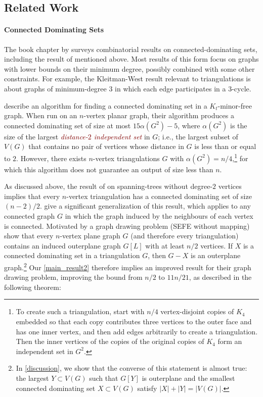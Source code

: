 \documentclass{article}
\newcommand{\defin}[1]{\emph{\textcolor{Maroon}{#1}}}
\theoremstyle{definition}
\begin{document}
\subsection{Related Work}
\label{related_work}

\paragraph{Connected Dominating Sets}

The book chapter by \citet{chellali.favaron:connected} surveys combinatorial results on connected-dominating sets, including the result of \citet{kleitman.west:spanning} mentioned above.  Most results of this form focus on graphs with lower bounds on their minimum degree, possibly combined with some other constraints.  For example, the Kleitman-West result relevant to triangulations is about graphs of minimum-degree $3$ in which each edge participates in a $3$-cycle.

\citet{wan.alzoubi.ea:simple} describe an algorithm for finding a connected dominating set in a $K_t$-minor-free graph. When run on an $n$-vertex planar graph, their algorithm produces a connected dominating set of size at most $15\alpha(G^2)-5$, where $\alpha(G^2)$ is the size of the largest \defin{distance-$2$ independent set} in $G$; i.e., the largest subset of $V(G)$ that contains no pair of vertices whose distance in $G$ is less than or equal to $2$.  However, there exists $n$-vertex triangulations $G$ with $\alpha(G^2)=n/4$,\footnote{To create such a triangulation, start with $n/4$ vertex-disjoint copies of $K_4$ embedded so that each copy contributes three vertices to the outer face and has one inner vertex, and then add edges arbitrarily to create a triangulation.  Then the inner vertices of the copies of the original copies of $K_4$ form an independent set in $G^2$.} for which this algorithm does not guarantee an output of size less than $n$.

As discussed above, the result of \citet{albertson.berman.ea:graphs} on spanning-trees without degree-$2$ vertices implies that every $n$-vertex triangulation has a connected dominating set of size $(n-2)/2$.  \citet{chen.ren.ea:homeomorphically} give a significant generalization of this result, which applies to any connected graph $G$ in which the graph induced by the neighbours of each vertex is connected.
 Motivated by  a graph drawing problem (SEFE without mapping) \citet{angelini.evans.ea:sefe} show that every $n$-vertex plane graph $G$ (and therefore every triangulation) contains an induced outerplane graph $G[L]$ with at least $n/2$ vertices.  If $X$ is a connected dominating set in a triangulation $G$, then $G-X$ is an outerplane graph.\footnote{In \cref{discussion}, we show that the converse of this statement is almost true: the largest $Y\subset V(G)$ such that $G[Y]$ is outerplane and the smallest connected dominating set $X\subset V(G)$ satisfy $|X|+|Y|=|V(G)|$.}  Our \cref{main_result2} therefore implies an improved result for their graph drawing problem, improving the bound from $n/2$ to $11n/21$, as described in the following theorem:
\end{document}
